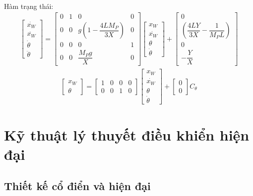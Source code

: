\paragraph{}Hàm trạng thái:
\begin{align}
\begin{bmatrix}
\dot{x_{W}}\\
\ddot{x_{W}}\\
\dot{\theta}\\
\ddot{\theta}
\end{bmatrix}
=
\begin{bmatrix}
0&1&0&0\\
0&0&g\left(1-\dfrac{4LM_{P}}{3X}\right)&0\\
0&0&0&1\\
0&0&\dfrac{M_{P}g}{X}&0
\end{bmatrix}
\begin{bmatrix}
x_{W}\\
\dot{x_{W}}\\
\theta\\
\dot{\theta}
\end{bmatrix}
+
\begin{bmatrix}
0\\
\left(\dfrac{4LY}{3X}-\dfrac{1}{M_{P}L}\right)\\
0\\
-\dfrac{Y}{X}
\end{bmatrix}
\end{align}
\begin{align}
\begin{bmatrix}
x_{W}\\
\theta
\end{bmatrix}
=
\begin{bmatrix}
1&0&0&0\\
0&0&1&0
\end{bmatrix}
\begin{bmatrix}
x_{W}\\
\dot{x_{W}}\\
\theta\\
\dot{\theta}
\end{bmatrix}
+
\begin{bmatrix}
0\\
0
\end{bmatrix}
C_{\theta}
\end{align}
\section{Kỹ thuật lý thuyết điều khiển hiện đại}
\subsection{Thiết kế cổ điển và hiện đại}

